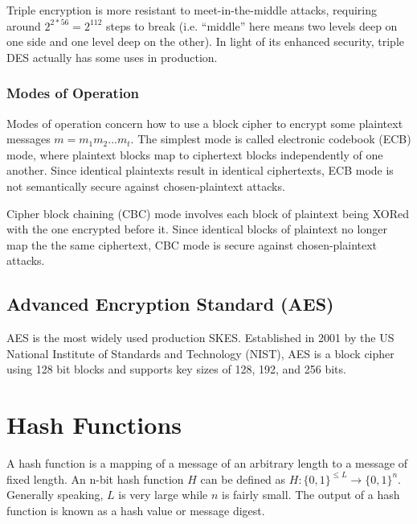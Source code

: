 \documentclass[12pt,titlepage]{article}
\let\stdsection\section
\renewcommand\section{\clearpage\stdsection}
\begin{document}
        Triple encryption is more resistant to meet-in-the-middle attacks, requiring around $2^{2*56} = 2^{112}$ steps to break (i.e. ``middle'' here means two levels
        deep on one side and one level deep on the other). In light of its enhanced security, triple DES actually has some uses in production.

      \subsubsection{Modes of Operation}
        Modes of operation concern how to use a block cipher to encrypt some plaintext messages $m = m_1 m_2 . . . m_t$. The simplest mode is called electronic codebook
        (ECB) mode, where plaintext blocks map to ciphertext blocks independently of one another. Since identical plaintexts result in identical ciphertexts, ECB mode
        is not semantically secure against chosen-plaintext attacks.

        Cipher block chaining (CBC) mode involves each block of plaintext being XORed with the one encrypted before it. Since identical blocks of plaintext no longer map
        the the same ciphertext, CBC mode is secure against chosen-plaintext attacks.

    \subsection{Advanced Encryption Standard (AES)}
      AES is the most widely used production SKES. Established in 2001 by the US National Institute of Standards and Technology (NIST), AES is a block cipher using 128 bit
      blocks and supports key sizes of 128, 192, and 256 bits.

  \section{Hash Functions}
    A hash function is a mapping of a message of an arbitrary length to a message of fixed length. An n-bit hash function $H$ can be defined as
    $H : \{0, 1\}^{\leq L} \rightarrow \{0, 1\}^n$. Generally speaking, $L$ is very large while $n$ is fairly small. The output of a hash function is known as a hash value
    or message digest.
\end{document}
